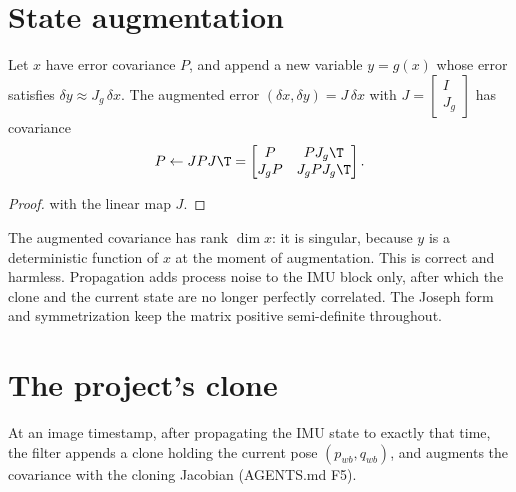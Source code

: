 \section{State augmentation}

\begin{proposition}
\label{prop:augmentation}
Let $x$ have error covariance $P$, and append a new variable $y = g(x)$ whose error satisfies $\delta y \approx J_g\,\delta x$. The
augmented error $(\delta x, \delta y) = J\,\delta x$ with $J = \begin{bmatrix} I \\ J_g\end{bmatrix}$ has covariance
\begin{equation}
  P \gets J P J\T = \begin{bmatrix} P & PJ_g\T \\ J_gP & J_gPJ_g\T \end{bmatrix}.
  \label{eq:augmentation}
\end{equation}
\end{proposition}
\begin{proof}
 with the linear map $J$.
\end{proof}

The augmented covariance has rank $\dim x$: it is singular, because $y$ is a deterministic function of $x$ at the moment of
augmentation. This is correct and harmless. Propagation adds process noise to the IMU block only, after which the clone and
the current state are no longer perfectly correlated. The Joseph form and symmetrization keep the matrix positive
semi-definite throughout.

\section{The project's clone}

At an image timestamp, after propagating the IMU state to exactly that time, the filter appends a clone holding the current
pose $(p_{wb}, q_{wb})$, and augments the covariance with the cloning Jacobian (AGENTS.md F5).

